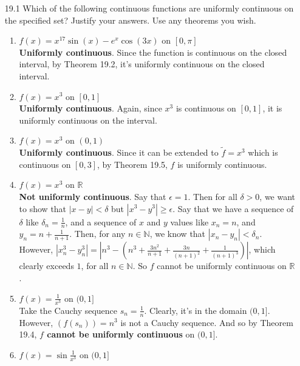 
\usepackage{amsmath, amssymb, dsfont}

\oddsidemargin 0in
\evensidemargin 0in
\textwidth 6.5in
\topmargin -0.5in
\textheight 9.0in
\newcommand{\norm}[1]{\left\lVert #1 \right\rVert}
\newcommand{\abs}[1]{\left\vert #1 \right\vert}
\newcommand{\?}{\stackrel{?}{=}}



\pagestyle{myheadings}

\begin{enumerate}
  \item [19.1]
    Which of the following continuous functions are uniformly continuous on the specified set? Justify your answers. Use any theorems you wish.
    \begin{enumerate}
      \item $f(x) = x^{17}\sin(x) - e^x \cos(3x)$ on $[0,\pi]$\\

        \textbf{Uniformly continuous}. Since the function is continuous on the closed interval, by Theorem 19.2, it's uniformly continuous on the closed interval.
      \item $f(x) = x^3$ on $[0,1]$\\

        \textbf{Uniformly continuous}. Again, since $x^3$ is continuous on $[0,1]$, it is uniformly continuous on the interval.
      \item $f(x) = x^3$ on $(0,1)$\\
        \textbf{Uniformly continuous}. Since it can be extended to $\tilde{f} = x^3$ which is continuous on $[0,3]$, by Theorem 19.5, $f$ is uniformly continuous.
      \item $f(x) = x^3$ on $\mathds{R}$\\
        \textbf{Not uniformly continuous}. Say that $\epsilon = 1$. Then for all $\delta > 0$, we want to show that $\abs{x-y} < \delta$ but $\abs{x^3 - y^3} \geq \epsilon$. Say that we have a sequence of $\delta$ like $\delta_n = \frac{1}{n}$, and a sequence of $x$ and $y$ values like $x_n = n$, and $y_n = n + \frac{1}{n+1}$. Then, for any $n \in \mathds{N}$, we know that $\abs{x_n - y_n} < \delta_n$. However, $\abs{x_n^3 - y_n^3} = \abs{n^3 - (n^3 + \frac{3n^2}{n+1} + \frac{3n}{(n+1)^2} + \frac{1}{(n+1)^3})}$, which clearly exceeds $1$, for all $n \in \mathds{N}$. So $f$ cannot be uniformly continuous on $\mathds{R}$.
        
      \item $f(x) = \frac{1}{x^3}$ on $(0,1]$\\
        Take the Cauchy sequence $s_n = \frac{1}{n}$. Clearly, it's in the domain $(0,1]$. However, $(f(s_n)) = n^3$ is not a Cauchy sequence. And so by Theorem 19.4, \textbf{$f$ cannot be uniformly continuous} on $(0,1]$.
      \item $f(x) = \sin \frac{1}{x^3}$ on $(0,1]$\\


\end{enumerate}
\end{enumerate}
